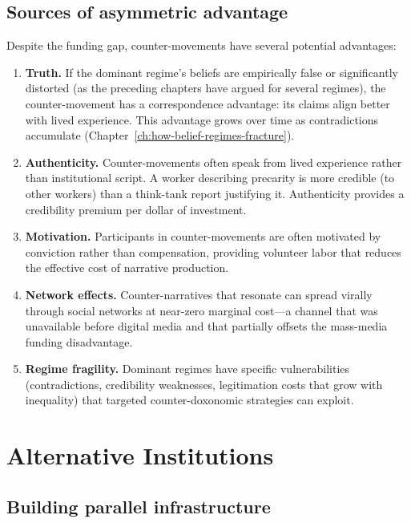 \subsection{Sources of asymmetric advantage}

Despite the funding gap, counter-movements have several potential advantages:

\begin{enumerate}
  \item \textbf{Truth.}
  If the dominant regime's beliefs are empirically false or significantly distorted (as the preceding chapters have argued for several regimes), the counter-movement has a correspondence advantage: its claims align better with lived experience.
  This advantage grows over time as contradictions accumulate (Chapter~\ref{ch:how-belief-regimes-fracture}).

  \item \textbf{Authenticity.}
  Counter-movements often speak from lived experience rather than institutional script.
  A worker describing precarity is more credible (to other workers) than a think-tank report justifying it.
  Authenticity provides a credibility premium per dollar of investment.

  \item \textbf{Motivation.}
  Participants in counter-movements are often motivated by conviction rather than compensation, providing volunteer labor that reduces the effective cost of narrative production.

  \item \textbf{Network effects.}
  Counter-narratives that resonate can spread virally through social networks at near-zero marginal cost---a channel that was unavailable before digital media and that partially offsets the mass-media funding disadvantage.

  \item \textbf{Regime fragility.}
  Dominant regimes have specific vulnerabilities (contradictions, credibility weaknesses, legitimation costs that grow with inequality) that targeted counter-doxonomic strategies can exploit.
\end{enumerate}

\section{Alternative Institutions}
\label{sec:ch31-alternatives}

\subsection{Building parallel infrastructure}

